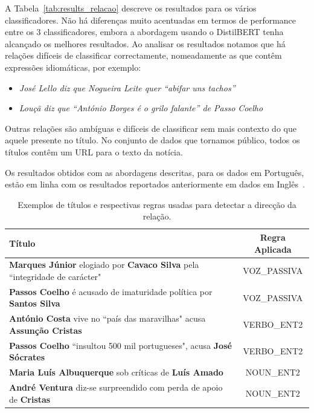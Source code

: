 \documentclass[a4paper, twocolumn, 11pt, twoside]{article}
\begin{document}
A Tabela~\ref{tab:results_relacao} descreve os resultados para os vários classificadores. Não há diferenças muito acentuadas em termos de performance entre os 3 classificadores, embora a abordagem usando o DistilBERT tenha alcançado os melhores resultados. Ao analisar os resultados notamos que há relações difíceis de classificar correctamente, nomeadamente as que contêm expressões idiomáticas, por exemplo:

\begin{itemize}
\item{\textit{José Lello diz que Nogueira Leite quer “abifar uns tachos”}}
\item{\textit{Louçã diz que “António Borges é o grilo falante” de Passo Coelho}}
\end{itemize}

Outras relações são ambíguas e difíceis de classificar sem mais contexto do que aquele presente no título. No conjunto de dados que tornamos público, todos os títulos contêm um URL para o texto da notícia. 

Os resultados obtidos com as abordagens descritas, para os dados em Português, estão em linha com os resultados reportados anteriormente em dados em Inglês~\citep{liang2019blames, park-etal-2021-blames}.


\begin{table}
  \centering
  \begin{tabular}{lc}
      {\bf Título} & {\bf Regra Aplicada} \\
      \hline
	  \textbf{Marques Júnior} elogiado por \textbf{Cavaco Silva} pela ``integridade de carácter" & VOZ\_PASSIVA \\
	  \textbf{Passos Coelho} é acusado de imaturidade política por \textbf{Santos Silva}  		 & VOZ\_PASSIVA \\
	  \textbf{António Costa} vive no ``país das maravilhas" acusa \textbf{Assunção Cristas}      & VERBO\_ENT2 \\
	  \textbf{Passos Coelho} ``insultou 500 mil portugueses", acusa \textbf{José Sócrates}		 & VERBO\_ENT2 \\ 
	  \textbf{Maria Luís Albuquerque} sob críticas de \textbf{Luís Amado}						 & NOUN\_ENT2 \\
	  \textbf{André Ventura} diz-se surpreendido com perda de apoio de \textbf{Cristas}			 & NOUN\_ENT2 \\

	  \hline
  \end{tabular}
  \caption{Exemplos de títulos e respectivas regras usadas para detectar a direcção da relação.}
  \label{tab:examples_patterns_direction}
\end{table}
\end{document}

